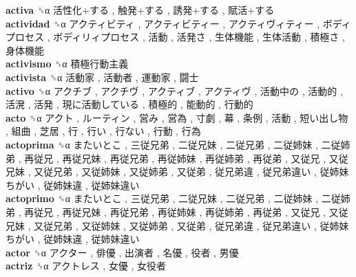 \textbf{activa} ␝α   活性化+する ,  触発+する ,  誘発+する ,  賦活+する   \\
\textbf{actividad} ␝α   アクティビティ ,  アクティビティー ,  アクティヴィティー ,  ボディプロセス ,  ボディリィプロセス ,  活動 ,  活発さ ,  生体機能 ,  生体活動 ,  積極さ ,  身体機能   \\
\textbf{activismo} ␝α   積極行動主義   \\
\textbf{activista} ␝α   活動家 ,  活動者 ,  運動家 ,  闘士   \\
\textbf{activo} ␝α   アクチブ ,  アクチヴ ,  アクティブ ,  アクティヴ ,  活動中の ,  活動的 ,  活溌 ,  活発 ,  現に活動している ,  積極的 ,  能動的 ,  行動的   \\
\textbf{acto} ␝α   アクト ,  ルーティン ,  営み ,  営為 ,  寸劇 ,  幕 ,  条例 ,  活動 ,  短い出し物 ,  組曲 ,  芝居 ,  行 ,  行い ,  行ない ,  行動 ,  行為   \\
\textbf{actoprima} ␝α   またいとこ ,  三従兄弟 ,  二従兄妹 ,  二従兄弟 ,  二従姉妹 ,  二従姉弟 ,  再従兄 ,  再従兄妹 ,  再従兄弟 ,  再従姉妹 ,  再従姉弟 ,  再従弟 ,  又従兄 ,  又従兄妹 ,  又従兄弟 ,  又従姉妹 ,  又従姉弟 ,  又従弟 ,  従兄弟違 ,  従兄弟違い ,  従姉妹ちがい ,  従姉妹違 ,  従姉妹違い   \\
\textbf{actoprimo} ␝α   またいとこ ,  三従兄弟 ,  二従兄妹 ,  二従兄弟 ,  二従姉妹 ,  二従姉弟 ,  再従兄 ,  再従兄妹 ,  再従兄弟 ,  再従姉妹 ,  再従姉弟 ,  再従弟 ,  又従兄 ,  又従兄妹 ,  又従兄弟 ,  又従姉妹 ,  又従姉弟 ,  又従弟 ,  従兄弟違 ,  従兄弟違い ,  従姉妹ちがい ,  従姉妹違 ,  従姉妹違い   \\
\textbf{actor} ␝α   アクター ,  俳優 ,  出演者 ,  名優 ,  役者 ,  男優   \\
\textbf{actriz} ␝α   アクトレス ,  女優 ,  女役者   \\
